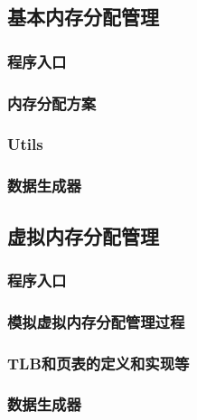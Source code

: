\subsection{基本内存分配管理}
\subsubsection{程序入口}

\subsubsection{内存分配方案}


\subsubsection{Utils}


\subsubsection{数据生成器}


\subsection{虚拟内存分配管理}
\subsubsection{程序入口}

\subsubsection{模拟虚拟内存分配管理过程}



\subsubsection{TLB和页表的定义和实现等}



\subsubsection{数据生成器}
